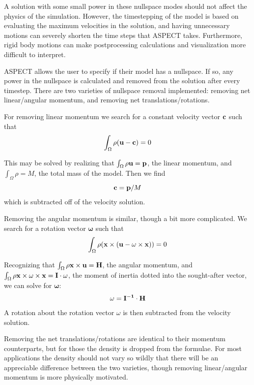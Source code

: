 \documentclass{article}
\newcommand{\aspect}{\textsc{ASPECT}}
\begin{document}
A solution with some small power in these nullspace modes should not affect the physics of the simulation.
However, the timestepping of the model is based on evaluating the maximum velocities in the solution,
and having unnecessary motions can severely shorten the time steps that \aspect{} takes.
Furthermore, rigid body motions can make postprocessing calculations and visualization more
difficult to interpret.

\aspect{} allows the user to specify if their model has a nullspace. If so, any power in the nullspace
is calculated and removed from the solution after every timestep.
There are two varieties of nullspace removal implemented: removing net linear/angular momentum, and
removing net translations/rotations.

For removing linear momentum we search for a constant velocity vector $\bf c$ such that
\begin{equation*}
\int_\Omega \rho ({\bf u - c}) = 0
\end{equation*}

This may be solved by realizing that $\int_\Omega \rho {\bf u} = {\bf p}$, the linear momentum, and
$\int_\Omega \rho = M$, the total mass of the model.  Then we find
\begin{equation*}
{\bf c} = {\bf p}/M
\end{equation*}
which is subtracted off of the velocity solution.

Removing the angular momentum is similar, though a bit more complicated.
We search for a rotation vector $\mathbf \omega$ such that
\begin{equation*}
\int_\Omega \rho ( {\bf x \times (u - {\mathbf \omega} \times x) } ) = 0
\end{equation*}

Recognizing that $\int_\Omega \rho {\bf x \times u} = {\bf H}$, the angular momentum,
and $\int_\Omega \rho {\bf x \times {\mathbf \omega} \times x} = {\bf I \cdot {\mathbf \omega} }$,
the moment of inertia dotted into the sought-after vector, we can solve for ${\mathbf \omega}$:
\begin{equation*}
{\mathbf \omega} = {\bf I^{-1} \cdot H}
\end{equation*}
A rotation about the rotation vector $\omega$ is then subtracted from the velocity solution.

Removing the net translations/rotations are identical to their momentum counterparts, but for those the
density is dropped from the formulae. For most applications the density should not vary so wildly
that there will be an appreciable difference between the two varieties,
though removing linear/angular momentum is more physically motivated.
\end{document}
